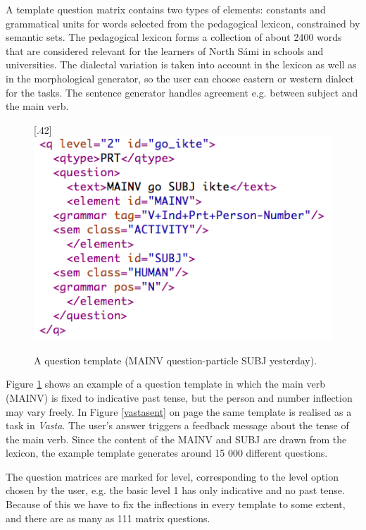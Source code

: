 \documentclass[11pt]{article}
\begin{document}
A template question matrix contains two types of elements: constants and grammatical units for words selected from the pedagogical lexicon, constrained by semantic sets. The pedagogical lexicon forms a collection of about 2400 words that are considered relevant for the learners of North Sámi in schools and universities. The dialectal variation is taken into account in the lexicon as well as in the morphological generator, so the user can choose eastern or western dialect for the tasks. The sentence generator handles agreement e.g. between subject and the main verb. \\ 

\begin{figure}[htbp]
\begin{center}
\scalebox{.42}[.42]{\includegraphics{presentation/img/sentencegenerator.png}}\\
\caption{A question template (MAINV question-particle SUBJ yesterday).}
\label{sentgen}
\end{center}
\end{figure}

Figure \ref{sentgen} shows an example of a question template in which the main verb (MAINV) is fixed to indicative past tense, but the person and number inflection may vary freely. In Figure \ref{vastasent} on page \pageref{vastasent} the same template is realised as a task in \textit{Vasta}. The user's answer triggers a feedback message about the tense of the main verb. Since the content of the MAINV and SUBJ are drawn from the lexicon, the example template generates around 15 000 different questions.
 

The question matrices are marked for level, corresponding to the level option chosen by the user, e.g. the basic level 1 has only indicative and no past tense. Because of this we have to fix the inflections in every template to some extent, and there are as many as 111 matrix questions. \\
 
\end{document}
